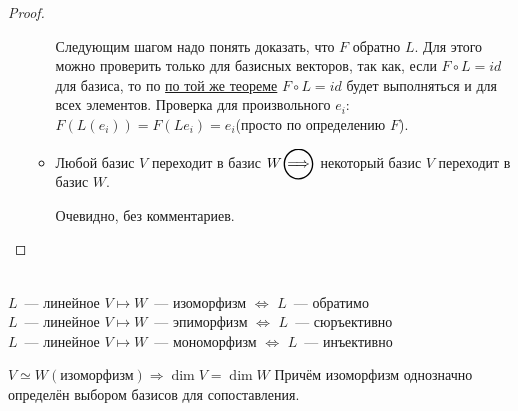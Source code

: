 \begin{proof}
\begin{enumerate}
\begin{itemize}
                    Следующим шагом надо понять доказать, что $F$ обратно $L$. Для этого можно проверить
                    только для базисных векторов, так как, если $F\circ L = id$ для базиса, то по \hyperref[thm:О свойстве линейного отображения действующего на базис]
                    {по той же теореме} $F\circ L = id$ будет выполняться и для всех элементов.
                    Проверка для произвольного $e_i$: $F(L(e_i)) = F(Le_i) = e_i$(просто по определению $F$).
                \item
                    Любой базис $V$ переходит в базис $W\ora $ некоторый базис $V$ переходит в базис $W$.

                    Очевидно, без комментариев.
            \end{itemize}
    \end{enumerate}
\end{proof}
\begin{definition}\leavevmode\\
    $L$~--- линейное $V\mapsto W$~--- изоморфизм $\Leftrightarrow$ $L$~--- обратимо\\
    $L$~--- линейное $V\mapsto W$~--- эпиморфизм $\Leftrightarrow$ $L$~--- сюръективно\\
    $L$~--- линейное $V\mapsto W$~--- мономорфизм $\Leftrightarrow$ $L$~--- инъективно
\end{definition}
\begin{remark}
    $V\simeq W(\text{изоморфизм})\Rightarrow  \dim V = \dim W$
    Причём изоморфизм однозначно определён выбором базисов для сопоставления.
\end{remark}
